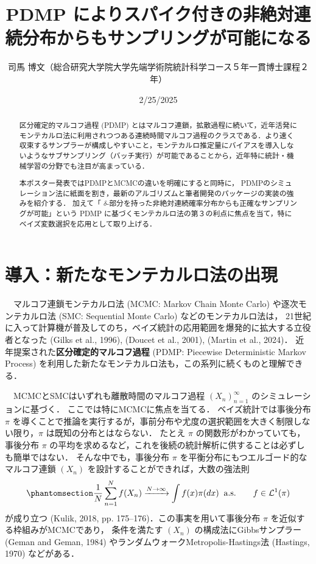 \documentclass[
]{article}
\title{\Large PDMP
によりスパイク付きの非絶対連続分布からもサンプリングが可能になる}
\author{司馬
博文（総合研究大学院大学先端学術院統計科学コース５年一貫博士課程２年）}
\date{2/25/2025}
\theoremstyle{StatementsWithUnderline}\newtheorem{theorem}{定理}[section]\newtheorem{definition}[theorem]{定義}\newtheorem{corollary}[theorem]{系}\newtheorem{proposition}[theorem]{命題}\newtheorem{lemma}[theorem]{補題}\newtheorem{example}[theorem]{例}
\theoremstyle{definition}\newtheorem{notation}[theorem]{記法}\newtheorem{algorithm}[theorem]{算譜}\newtheorem{remarks}[theorem]{要諦}\newtheorem{remark}[theorem]{注}
\begin{document}
\maketitle
\begin{abstract}
区分確定的マルコフ過程 (PDMP)
とはマルコフ連鎖，拡散過程に続いて，近年活発にモンテカルロ法に利用されつつある連続時間マルコフ過程のクラスである．より速く収束するサンプラーが構成しやすいこと，モンテカルロ推定量にバイアスを導入しないようなサブサンプリング（バッチ実行）が可能であることから，近年特に統計・機械学習の分野でも注目が高まっている．

本ポスター発表ではPDMPとMCMCの違いを明確にすると同時に，
PDMPのシミュレーション法に紙面を割き，最新のアルゴリズムと筆者開発のパッケージの実装の強みを紹介する．
加えて「
\(\delta\)-部分を持った非絶対連続確率分布からも正確なサンプリングが可能」という
PDMP
に基づくモンテカルロ法の第３の利点に焦点を当て，特にベイズ変数選択を応用として取り上げる．
\end{abstract}


\section{導入：新たなモンテカルロ法の出現}\label{ux5c0eux5165ux65b0ux305fux306aux30e2ux30f3ux30c6ux30abux30ebux30edux6cd5ux306eux51faux73fe}

　マルコフ連鎖モンテカルロ法 (MCMC: Markov Chain Monte Carlo)
や逐次モンテカルロ法 (SMC: Sequential Monte Carlo)
などのモンテカルロ法は，
21世紀に入って計算機が普及してのち，ベイズ統計の応用範囲を爆発的に拡大する立役者となった
(Gilks et al., 1996), (Doucet et al., 2001), (Martin et al., 2024)．
近年提案された\textbf{区分確定的マルコフ過程} (PDMP: Piecewise
Deterministic Markov Process)
を利用した新たなモンテカルロ法も，この系列に続くものと理解できる．

　MCMCとSMCはいずれも離散時間のマルコフ過程 \((X_n)_{n=1}^\infty\)
のシミュレーションに基づく． ここでは特にMCMCに焦点を当てる．
ベイズ統計では事後分布 \(\pi\)
を導くことで推論を実行するが，事前分布や尤度の選択範囲を大きく制限しない限り，\(\pi\)
は既知の分布とはならない． たとえ \(\pi\)
の関数形がわかっていても，事後分布 \(\pi\)
の平均を求めるなど，これを後続の統計解析に供することは必ずしも簡単ではない．
そんな中でも，事後分布 \(\pi\)
を平衡分布にもつエルゴード的なマルコフ連鎖 \((X_n)\)
を設計することができれば，大数の強法則
\begin{equation}\phantomsection\label{eq-LLN}{
\frac{1}{N}\sum_{n=1}^Nf(X_n)\xrightarrow{N\to\infty}\int f(x)\pi(dx)\;\;\text{a.s.}\qquad f\in\mathcal{L}^1(\pi)
}\end{equation} が成り立つ (Kulik, 2018, pp.
175--176)．この事実を用いて事後分布 \(\pi\)
を近似する枠組みがMCMCであり， 条件を満たす \((X_n)\)
の構成法にGibbsサンプラー (Geman and Geman, 1984)
やランダムウォークMetropolis-Hastings法 (Hastings, 1970) などがある．
\end{document}
